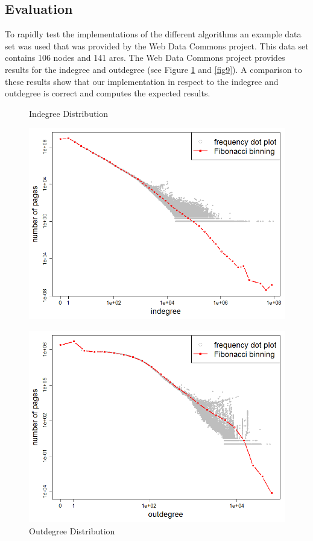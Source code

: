 \subsection{Evaluation}
To rapidly test the implementations of the different algorithms an example data set was used that was provided by the Web Data Commons project. This data set contains 106 nodes and 141 arcs. The Web Data Commons project provides results for the indegree and outdegree (see Figure \ref{fig8} and \ref{fig9}). A comparison to these results show that our implementation in respect to the indegree and outdegree is correct and computes the expected results.

\begin{figure}[H]
\begin{minipage}{.5\textwidth}
	\begin{center}
		\caption{Indegree Distribution}		
		\label{fig7}		
		\includegraphics[width=1.0\textwidth]{fig7}	
	\end{center}
\end{minipage}
\begin{minipage}{.5\textwidth}
	\begin{center}
		\caption{Outdegree Distribution}		
		\label{fig8}		
		\includegraphics[width=1.0\textwidth]{fig8}	
	\end{center}
\end{minipage}
\end{figure}

